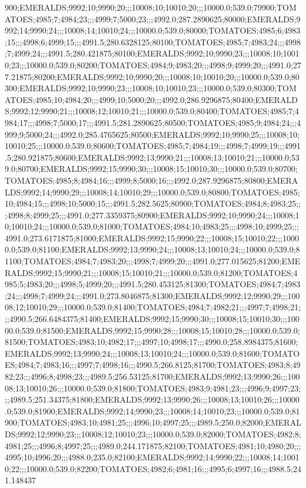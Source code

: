 900;EMERALDS;9992;10;9990;20;;;10008;10;10010;20;;;10000.0;539.0;79900;TOMATOES;4985;7;4984;23;;;4999;7;5000;23;;;4992.0;287.2890625;80000;EMERALDS;9992;14;9990;24;;;10008;14;10010;24;;;10000.0;539.0;80000;TOMATOES;4985;6;4983;15;;;4998;6;4999;15;;;4991.5;280.6328125;80100;TOMATOES;4985;7;4983;24;;;4998;7;4999;24;;;4991.5;280.421875;80100;EMERALDS;9992;10;9990;23;;;10008;10;10010;23;;;10000.0;539.0;80200;TOMATOES;4984;9;4983;20;;;4998;9;4999;20;;;4991.0;277.21875;80200;EMERALDS;9992;10;9990;20;;;10008;10;10010;20;;;10000.0;539.0;80300;EMERALDS;9992;10;9990;23;;;10008;10;10010;23;;;10000.0;539.0;80300;TOMATOES;4985;10;4984;20;;;4999;10;5000;20;;;4992.0;286.9296875;80400;EMERALDS;9992;12;9990;21;;;10008;12;10010;21;;;10000.0;539.0;80400;TOMATOES;4985;7;4984;17;;;4998;7;5000;17;;;4991.5;281.2890625;80500;TOMATOES;4985;9;4984;24;;;4999;9;5000;24;;;4992.0;285.4765625;80500;EMERALDS;9992;10;9990;25;;;10008;10;10010;25;;;10000.0;539.0;80600;TOMATOES;4985;7;4984;19;;;4998;7;4999;19;;;4991.5;280.921875;80600;EMERALDS;9992;13;9990;21;;;10008;13;10010;21;;;10000.0;539.0;80700;EMERALDS;9992;15;9990;30;;;10008;15;10010;30;;;10000.0;539.0;80700;TOMATOES;4985;8;4984;16;;;4999;8;5000;16;;;4992.0;287.9296875;80800;EMERALDS;9992;14;9990;29;;;10008;14;10010;29;;;10000.0;539.0;80800;TOMATOES;4985;10;4984;15;;;4998;10;5000;15;;;4991.5;282.5625;80900;TOMATOES;4984;8;4983;25;;;4998;8;4999;25;;;4991.0;277.3359375;80900;EMERALDS;9992;10;9990;24;;;10008;10;10010;24;;;10000.0;539.0;81000;TOMATOES;4984;10;4983;25;;;4998;10;4999;25;;;4991.0;273.6171875;81000;EMERALDS;9992;15;9990;22;;;10008;15;10010;22;;;10000.0;539.0;81100;EMERALDS;9992;13;9990;24;;;10008;13;10010;24;;;10000.0;539.0;81100;TOMATOES;4984;7;4983;20;;;4998;7;4999;20;;;4991.0;277.015625;81200;EMERALDS;9992;15;9990;21;;;10008;15;10010;21;;;10000.0;539.0;81200;TOMATOES;4985;5;4983;20;;;4998;5;4999;20;;;4991.5;280.453125;81300;TOMATOES;4984;7;4983;24;;;4998;7;4999;24;;;4991.0;273.8046875;81300;EMERALDS;9992;12;9990;29;;;10008;12;10010;29;;;10000.0;539.0;81400;TOMATOES;4984;7;4982;21;;;4997;7;4998;21;;;4990.5;266.6484375;81400;EMERALDS;9992;15;9990;30;;;10008;15;10010;30;;;10000.0;539.0;81500;EMERALDS;9992;15;9990;28;;;10008;15;10010;28;;;10000.0;539.0;81500;TOMATOES;4983;10;4982;17;;;4997;10;4998;17;;;4990.0;258.8984375;81600;EMERALDS;9992;13;9990;24;;;10008;13;10010;24;;;10000.0;539.0;81600;TOMATOES;4984;7;4983;16;;;4997;7;4998;16;;;4990.5;266.8125;81700;TOMATOES;4983;8;4982;23;;;4996;8;4998;23;;;4989.5;256.53125;81700;EMERALDS;9992;13;9990;26;;;10008;13;10010;26;;;10000.0;539.0;81800;TOMATOES;4983;9;4981;23;;;4996;9;4997;23;;;4989.5;251.34375;81800;EMERALDS;9992;13;9990;26;;;10008;13;10010;26;;;10000.0;539.0;81900;EMERALDS;9992;14;9990;23;;;10008;14;10010;23;;;10000.0;539.0;81900;TOMATOES;4983;10;4981;25;;;4996;10;4997;25;;;4989.5;250.0;82000;EMERALDS;9992;12;9990;23;;;10008;12;10010;23;;;10000.0;539.0;82000;TOMATOES;4982;8;4981;25;;;4996;8;4997;25;;;4989.0;244.171875;82100;TOMATOES;4981;10;4980;20;;;4995;10;4996;20;;;4988.0;235.0;82100;EMERALDS;9992;14;9990;22;;;10008;14;10010;22;;;10000.0;539.0;82200;TOMATOES;4982;6;4981;16;;;4995;6;4997;16;;;4988.5;241.148437